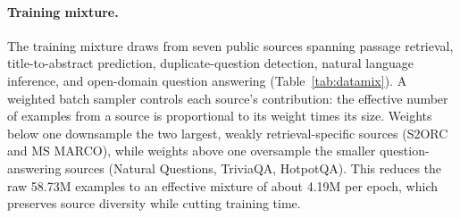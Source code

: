 \paragraph{Training mixture.}
The training mixture draws from seven public sources spanning passage retrieval,
title-to-abstract prediction, duplicate-question detection, natural language
inference, and open-domain question answering (Table~\ref{tab:datamix}). A
weighted batch sampler controls each source's contribution: the effective number
of examples from a source is proportional to its weight times its size. Weights
below one downsample the two largest, weakly retrieval-specific sources (S2ORC
and MS MARCO), while weights above one oversample the smaller question-answering
sources (Natural Questions, TriviaQA, HotpotQA). This reduces the raw 58.73M
examples to an effective mixture of about 4.19M per epoch, which preserves source
diversity while cutting training time.

\begin{table}[h]
  \centering
  \caption{Training data mixture. Effective rows are each source's approximate
  contribution after weighted sampling (proportional to weight $\times$ total
  rows), scaled so the mixture totals about 4.19M examples per epoch.}
  \label{tab:datamix}
\end{table}

